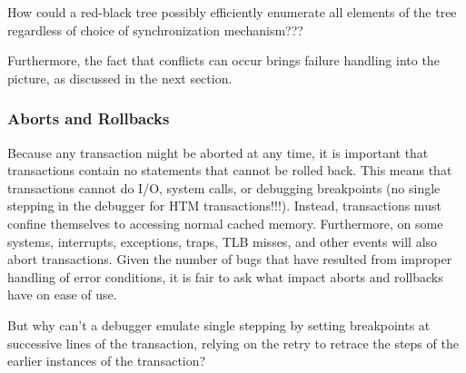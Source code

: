 \QuickQuiz{}
	How could a red-black tree possibly efficiently enumerate all
	elements of the tree regardless of choice of synchronization
	mechanism???
 \QuickQuizEnd

Furthermore, the fact that conflicts can occur brings failure handling
into the picture, as discussed in the next section.

\subsubsection{Aborts and Rollbacks}
\label{sec:future:Aborts and Rollbacks}

Because any transaction might be aborted at any time, it is important
that transactions contain no statements that cannot be rolled back.
This means that transactions cannot do I/O, system calls, or debugging
breakpoints (no single stepping in the debugger for HTM transactions!!!).
Instead, transactions must confine themselves to accessing normal
cached memory.
Furthermore, on some systems, interrupts, exceptions, traps,
TLB misses, and other events will also abort transactions.
Given the number of bugs that have resulted from improper handling
of error conditions, it is fair to ask what impact aborts and rollbacks
have on ease of use.

\QuickQuiz{}
	But why can't a debugger emulate single stepping by setting
	breakpoints at successive lines of the transaction, relying
	on the retry to retrace the steps of the earlier instances
	of the transaction?
 \QuickQuizEnd

